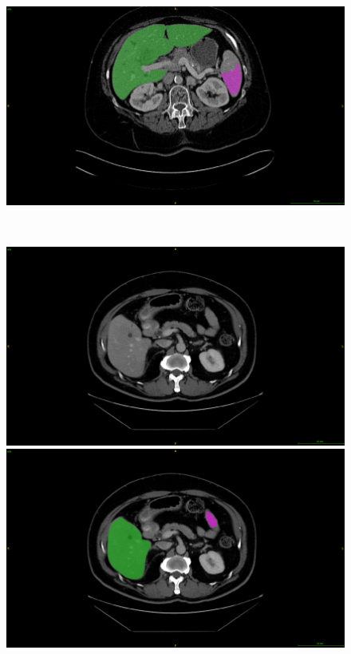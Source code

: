 \begin{figure}[ht!]
\begin{minipage}{0.45\linewidth}
	\end{minipage} \hspace{-0.1cm}
	\begin{minipage}{0.45\linewidth}
		\includegraphics[width=\linewidth]{../Contributions/images/MisSegmentations/ResizeTCGA-BC-A10Z_slice30_liverPrediction_Cmap}
	\end{minipage} \\
	\begin{minipage}{0.45\linewidth}
		\includegraphics[width=\linewidth]{../Contributions/images/MisSegmentations/ResizeTCGA-DD-A1EA_slice30_raw}
	\end{minipage} \hspace{-0.1cm}
	\begin{minipage}{0.45\linewidth}
		\includegraphics[width=\linewidth]{../Contributions/images/MisSegmentations/ResizeTCGA-DD-A1EA_slice30_liverPrediction_Cmap}

\end{minipage}
\end{figure}
